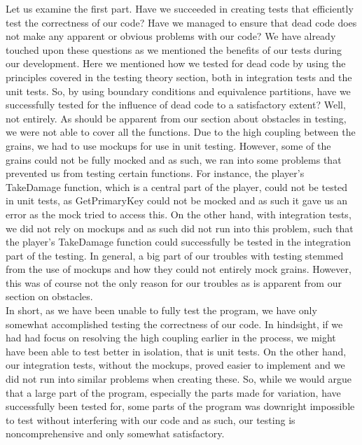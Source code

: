 Let us examine the first part. Have we succeeded in creating tests that efficiently test the correctness of our code? Have we managed to ensure that dead code does not make any apparent or obvious problems with our code? We have already touched upon these questions as we mentioned the benefits of our tests during our development. Here we mentioned how we tested for dead code by using the principles covered in the testing theory section, both in integration tests and the unit tests. So, by using boundary conditions and equivalence partitions, have we successfully tested for the influence of dead code to a satisfactory extent? Well, not entirely. As should be apparent from our section about obstacles in testing, we were not able to cover all the functions. Due to the high coupling between the grains, we had to use mockups for use in unit testing. However, some of the grains could not be fully mocked and as such, we ran into some problems that prevented us from testing certain functions. For instance, the player's TakeDamage function, which is a central part of the player, could not be tested in unit tests, as GetPrimaryKey could not be mocked and as such it gave us an error as the mock tried to access this. On the other hand, with integration tests, we did not rely on mockups and as such did not run into this problem, such that the player's TakeDamage function could successfully be tested in the integration part of the testing. In general, a big part of our troubles with testing stemmed from the use of mockups and how they could not entirely mock grains. However, this was of course not the only reason for our troubles as is apparent from our section on obstacles. \\
In short, as we have been unable to fully test the program, we have only somewhat accomplished testing the correctness of our code. In hindsight, if we had had focus on resolving the high coupling earlier in the process, we might have been able to test better in isolation, that is unit tests. On the other hand, our integration tests, without the mockups, proved easier to implement and we did not run into similar problems when creating these. So, while we would argue that a large part of the program, especially the parts made for variation, have successfully been tested for, some parts of the program was downright impossible to test without interfering with our code and as such, our testing is noncomprehensive and only somewhat satisfactory. \\
\\
